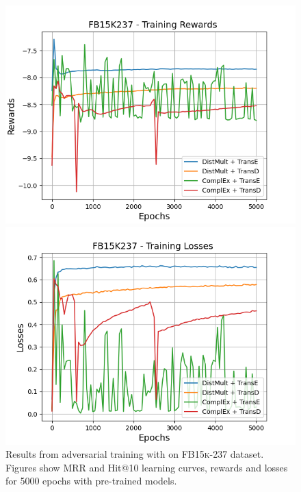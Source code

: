\begin{figure}
    \begin{minipage}{.45\textwidth}
      \centering
      \includegraphics[width=0.9\linewidth]{figures/results/gan_train/pretrained/uncertainty/max/entropy/fb15k237/5k_epochs/uncertainty_fb15k237_rew.png}
    \end{minipage}%
     \begin{minipage}{.45\textwidth}
      \centering
      \includegraphics[width=0.9\linewidth]{figures/results/gan_train/pretrained/uncertainty/max/entropy/fb15k237/5k_epochs/uncertainty_fb15k237_losses.png}
    \end{minipage}%
    \caption{Results from adversarial training with \usmax on \textsc{FB15k-237} dataset.
    Figures show MRR and Hit@10 learning curves, rewards and losses for 5000 epochs with pre-trained models.}
    \label{fig:gan_train_pretrained_usmax_fb15k237}
\end{figure}
